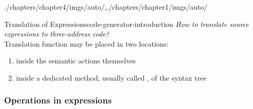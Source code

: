 \begin{graphicspathcontext}{{./chapters/chapter4/imgs/auto/},{./chapters/chapter1/imgs/auto/}}
\begin{bibunit}[apalike]
\begin{leftlawnframe}{Translation of Expressions}{code-generator-introduction}
	\emph{How to translate source expressions to three-address code?} \\[.25cm]
	Translation function may be placed in two locations:
	\begin{enumerate}
		\item inside the semantic actions themselves
		\item inside a dedicated method, usually called , of the syntax tree
	\end{enumerate}
\end{leftlawnframe}

\subsubsection{Operations in expressions}
\subsubsectiontableofcontentslide


\end{bibunit}
\end{graphicspathcontext}
